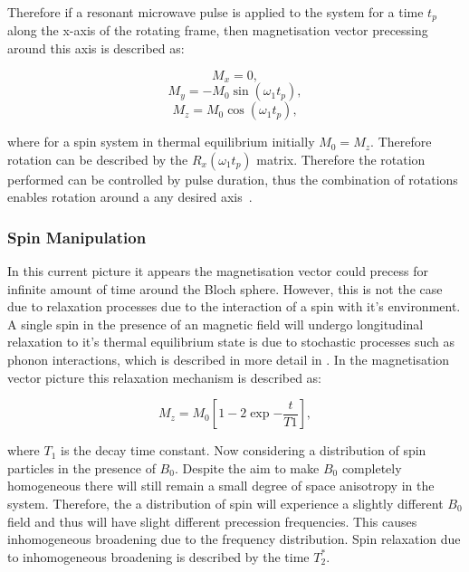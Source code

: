Therefore if a resonant microwave pulse is applied to the system for a time $t_{p}$ along the x-axis of the rotating frame, then magnetisation vector precessing around this axis is described as:

\begin{equation}
\label{eq:magneticfieldcomponentsx1}
M_{x}=0,
\end{equation}
\begin{equation}
\label{eq:magneticfieldcomponentsy1}
M_{y}=-M_{0}\sin(\omega_{1}t_{p}),
\end{equation}
\begin{equation}
\label{eq:magneticfieldcomponentsz1}
M_{z} = M_{0}\cos(\omega_{1}t_{p}),
\end{equation}

\noindent where for a spin system in thermal equilibrium initially $M_{0}=M_{z}$. Therefore rotation can be described by the $R_{x}(\omega_{1}t_{p})$ matrix. Therefore the rotation performed can be controlled by pulse duration, thus the combination of rotations enables rotation around a any desired axis~\citep{schweiger2001principles}.   




\subsubsection{Spin Manipulation} 
In this current picture it appears the magnetisation vector could precess for infinite amount of time around the Bloch sphere. However, this is not the case due to relaxation processes due to the interaction of a spin with it's environment. A single spin in the presence of an magnetic field will undergo longitudinal relaxation to it's thermal equilibrium state is due to stochastic processes such as phonon interactions, which is described in more detail in \label{sec:YSOdopedYbions}. In the magnetisation vector picture this relaxation mechanism is described as: 

\begin{equation}
\label{eq:mzfe}
M_{z}=M_{0}\left [ 1-2\exp{-\frac{t}{T1}} \right ],
\end{equation}

\noindent where $T_{1}$ is the decay time constant. Now considering a distribution of spin particles in the presence of $B_{0}$. Despite the aim to make $B_{0}$ completely homogeneous there will still remain a small degree of space anisotropy in the system. Therefore, the a distribution of spin will experience a slightly different $B_{0}$ field and thus will have slight different precession frequencies. This causes inhomogeneous broadening due to the frequency distribution. Spin relaxation due to inhomogeneous broadening is described by the time $T_{2}^{*}$.

